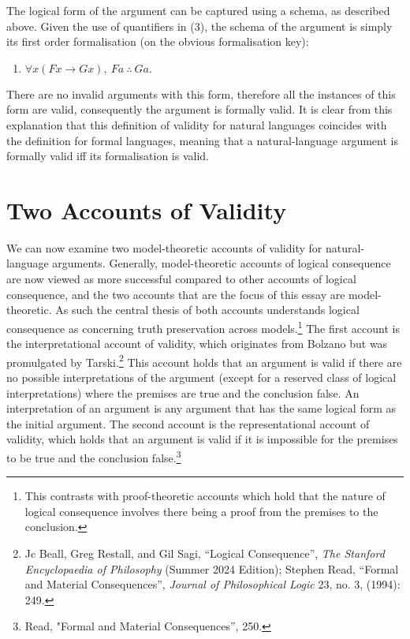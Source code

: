 \noindent The logical form of the argument can be captured using a schema, as
described above. Given the use of quantifiers in (3), the schema of the
argument is simply its first order formalisation (on the obvious
formalisation key):

\begin{enumerate}[leftmargin=42pt] 

\def\labelenumi{(\arabic{enumi})}
\setcounter{enumi}{3}
\item
  $ \forall x(Fx \rightarrow Gx), \ Fa \ \therefore \ Ga.$
\end{enumerate} 

\noindent There are no invalid arguments with this form, therefore all the
instances of this form are valid, consequently the argument is formally
valid. It is clear from this explanation that this definition of
validity for natural languages coincides with the definition for formal
languages, meaning that a natural-language argument is formally valid
iff its formalisation is valid.

\section*{Two Accounts of Validity}

We can now examine two model-theoretic accounts of validity for
natural-language arguments. Generally, model-theoretic accounts of
logical consequence are now viewed as more successful compared to other
accounts of logical consequence, and the two accounts that are the focus
of this essay are model-theoretic. As such the central thesis of both
accounts understands logical consequence as concerning truth
preservation across models.\footnote{This contrasts with proof-theoretic
  accounts which hold that the nature of logical consequence involves
  there being a proof from the premises to the conclusion.} The first
account is the interpretational account of validity, which originates
from Bolzano but was promulgated by Tarski.\footnote{Jc Beall, Greg
  Restall, and Gil Sagi, ``Logical Consequence'', \emph{The Stanford
  Encyclopaedia of Philosophy} (Summer 2024 Edition); Stephen Read,
  ``Formal and Material Consequences'', \emph{Journal of Philosophical
  Logic} 23, no. 3, (1994): 249.} This account holds that an argument is
valid if there are no possible interpretations of the argument (except
for a reserved class of logical interpretations) where the premises are
true and the conclusion false. An interpretation of an argument is any
argument that has the same logical form as the initial argument. The
second account is the representational account of validity, which holds
that an argument is valid if it is impossible for the premises to be
true and the conclusion false.\footnote{Read, "Formal and Material
  Consequences'', 250.}

